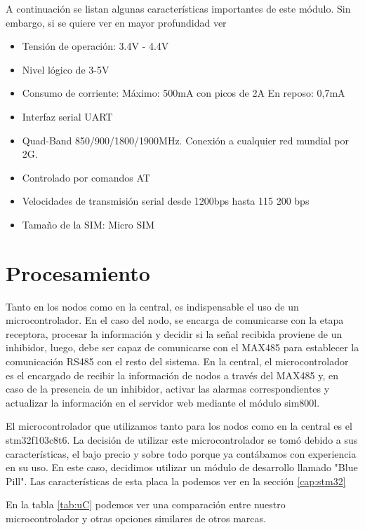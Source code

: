 A continuación se listan algunas características importantes de este módulo. Sin embargo, si se quiere ver en mayor profundidad ver \todo

\begin{itemize}
    \item Tensión de operación: 3.4V - 4.4V
    \item Nivel lógico de 3-5V
    \item Consumo de corriente:
    \subitem Máximo: 500mA con picos de 2A
    \subitem En reposo: 0,7mA
    \item Interfaz serial UART
    \item Quad-Band 850/900/1800/1900MHz. Conexión a cualquier red mundial por 2G.
    \item Controlado por comandos AT
    \item Velocidades de transmisión serial desde 1200bps hasta 115 200 bps
    \item Tamaño de la SIM: Micro SIM
\end{itemize}

\section{Procesamiento} \par

Tanto en los nodos como en la central, es indispensable el uso de un microcontrolador. En el caso del nodo, se encarga de comunicarse con la etapa receptora,
procesar la información y decidir si la señal recibida proviene de un inhibidor, luego, debe ser capaz de comunicarse con el MAX485 para establecer la comunicación
RS485 con el resto del sistema. En la central, el microcontrolador es el encargado de recibir la información de nodos a través del MAX485 y,
en caso de la presencia de un inhibidor, activar las alarmas correspondientes y actualizar la información en el servidor web mediante el módulo sim800l. \par

El microcontrolador que utilizamos tanto para los nodos como en la central es el stm32f103c8t6. La decisión de utilizar este microcontrolador se tomó debido 
a sus características, el bajo precio y sobre todo porque ya contábamos con experiencia en su uso.
En este caso, decidimos utilizar un módulo de desarrollo llamado "Blue Pill". Las características de esta placa la podemos ver en la sección \ref{cap:stm32}

En la tabla \ref{tab:uC} podemos ver una comparación entre nuestro microcontrolador y otras opciones similares de otros marcas.

